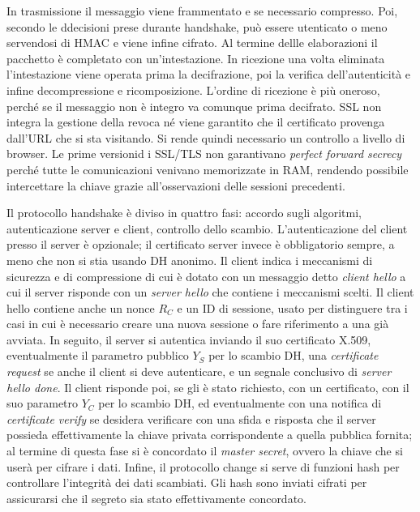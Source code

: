 \documentclass[answers, a4paper, 11pt]{exam}
\begin{document}
\begin{questions}
\begin{parts}
\begin{solution}
In trasmissione il messaggio viene frammentato e se necessario compresso.
Poi, secondo le ddecisioni prese durante handshake, può essere utenticato o meno servendosi di HMAC e viene infine cifrato.
Al termine dellle elaborazioni il pacchetto è completato con un'intestazione.
In ricezione una volta eliminata l'intestazione viene operata prima la decifrazione, poi la verifica dell'autenticità e infine decompressione e ricomposizione.
L'ordine di ricezione è più oneroso, perché se il messaggio non è integro va comunque prima decifrato.
SSL non integra la gestione della revoca né viene garantito che il certificato provenga dall'URL che si sta visitando.
Si rende quindi necessario un controllo a livello di browser.
	Le prime versionid i SSL/TLS non garantivano \textit{perfect forward secrecy} perché tutte le comunicazioni venivano memorizzate in RAM, rendendo possibile intercettare la chiave grazie all'osservazioni delle sessioni precedenti.

			Il protocollo handshake è diviso in quattro fasi: accordo sugli algoritmi, autenticazione server e client, controllo dello scambio.
L'autenticazione del client presso il server è opzionale; il certificato server invece è obbligatorio sempre, a meno che non si stia usando DH anonimo.
Il client indica i meccanismi di sicurezza e di compressione di cui è dotato con un messaggio detto \textit{client hello} a cui il server risponde con un \textit{server hello} che contiene i meccanismi scelti.
Il client hello contiene anche un nonce $R_C$ e un ID di sessione, usato per distinguere tra i casi in cui è necessario creare una nuova sessione o fare riferimento a una già avviata.
In seguito, il server si autentica inviando il suo certificato X.509, eventualmente il parametro pubblico $Y_S$ per lo scambio DH, una \textit{certificate request} se anche il client si deve autenticare, e un segnale conclusivo di \textit{server hello done}.
	Il client risponde poi, se gli è stato richiesto, con un certificato, con il suo parametro $Y_C$ per lo scambio DH, ed eventualmente con una notifica di \textit{certificate verify} se desidera verificare con una sfida e risposta che il server possieda effettivamente la chiave privata corrispondente a quella pubblica fornita; al termine di questa fase si è concordato il \textit{master secret}, ovvero la chiave che si userà per cifrare i dati.
Infine, il protocollo change si serve di funzioni hash per controllare l'integrità dei dati scambiati.
	Gli hash sono inviati cifrati per assicurarsi che il segreto sia stato effettivamente concordato.


\end{solution}
\end{parts}
\end{questions}
\end{document}
